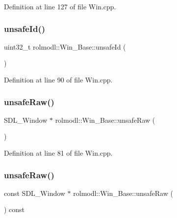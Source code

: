 Definition at line 127 of file Win.\+cpp.

\mbox{\label{classrolmodl_1_1_win___base_a0efef417d9cc3d838a84c70a8179d5b6}} 
\subsubsection{\texorpdfstring{unsafeId()}{unsafeId()}}
{\footnotesize\ttfamily uint32\+\_\+t rolmodl\+::\+Win\+\_\+\+Base\+::unsafe\+Id (\begin{DoxyParamCaption}{ }\end{DoxyParamCaption})}



Definition at line 90 of file Win.\+cpp.

\mbox{\label{classrolmodl_1_1_win___base_a7a93f6c843993690471642a5350f625b}} 
\subsubsection{\texorpdfstring{unsafeRaw()}{unsafeRaw()}\hspace{0.1cm}{\footnotesize\ttfamily [1/2]}}
{\footnotesize\ttfamily S\+D\+L\+\_\+\+Window $\ast$ rolmodl\+::\+Win\+\_\+\+Base\+::unsafe\+Raw (\begin{DoxyParamCaption}{ }\end{DoxyParamCaption})\hspace{0.3cm}{\ttfamily [noexcept]}}



Definition at line 81 of file Win.\+cpp.

\mbox{\label{classrolmodl_1_1_win___base_ac74ad951ad66254d4d292039559f0d06}} 
\subsubsection{\texorpdfstring{unsafeRaw()}{unsafeRaw()}\hspace{0.1cm}{\footnotesize\ttfamily [2/2]}}
{\footnotesize\ttfamily const S\+D\+L\+\_\+\+Window $\ast$ rolmodl\+::\+Win\+\_\+\+Base\+::unsafe\+Raw (\begin{DoxyParamCaption}{ }\end{DoxyParamCaption}) const\hspace{0.3cm}{\ttfamily [noexcept]}}



